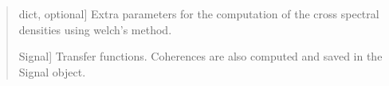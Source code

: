 \documentclass[letterpaper,10pt,english]{sphinxmanual}
\begin{document}
\begin{fulllineitems}
\begin{quote}
\begin{description}
\begin{description}
\sphinxlineitem{\sphinxstylestrong{**kwargs}}{[}dict, optional{]}
\sphinxAtStartPar
Extra parameters for the computation of the cross spectral densities
using welch’s method.

\end{description}

\begin{description}
\sphinxlineitem{\sphinxstylestrong{tf}}{[}Signal{]}
\sphinxAtStartPar
Transfer functions. Coherences are also computed and saved in the
Signal object.

\end{description}

\end{description}\end{quote}

\end{fulllineitems}

\end{document}
